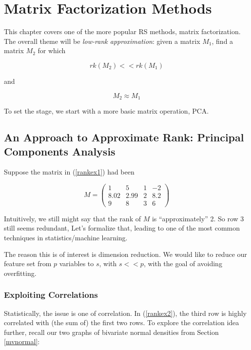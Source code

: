 
\chapter{Matrix Factorization Methods}   

This chapter covers one of the more popular RS methods, matrix
factorization.  The overall theme will be \textit{low-rank
approximation}:  given a matrix $M_1$,  find a matrix $M_2$ for which 

\begin{equation}
rk(M_2) << rk(M_1)
\end{equation}

and 

\begin{equation}
M_2 \approx M_1
\end{equation}


To set the stage, we start with a more basic matrix
operation, PCA.

\section{An Approach to Approximate Rank:  Principal Components
Analysis}

Suppose the matrix in (\ref{rankex1}) had been

\begin{equation}
\label{rankex2}  
M =
\left (
\begin{array}{rrrr}
1 & 5 & 1 & -2\\
8.02 & 2.99 & 2 & 8.2\\
9 & 8 & 3 & 6 
\end{array}
\right )
\end{equation}

Intuitively, we still might say that the rank of $M$ is
``approximately'' 2.  So row 3 still seems redundant, Let's
formalize that, leading to one of the most common techniques in
statistics/machine learning.  

The reason this is of interest is dimension reduction.  We would like to
reduce our feature set from $p$ variables to $s$, with $s << p$, with
the goal of avoiding overfitting.

\subsection{Exploiting Correlations}
\label{explorecorr}

Statistically, the issue is one of correlation.  In (\ref{rankex2}), the
third row is highly correlated with (the sum of) the first two rows.  To
explore the correlation idea further, recall our two graphs of bivariate
normal densities from Section \ref{mvnormal}:

